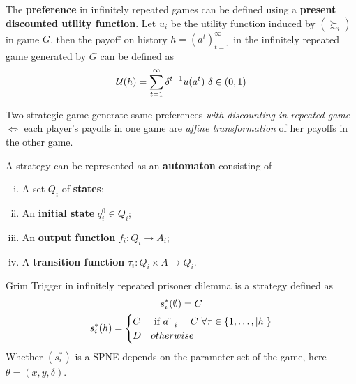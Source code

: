 \documentclass[11pt]{article}
\begin{document}
				\begin{definition}
					The \textbf{preference} in infinitely repeated games can be defined using a \textbf{present discounted utility function}. Let $u_i$ be the utility function induced by $(\succsim_i)$ in game $G$, then the payoff on history $h = (a^t)_{t=1}^\infty$ in the infinitely repeated game generated by $G$ can be defined as
					\begin{gather}
						\mathcal{{U}}(h) = \sum_{t=1}^\infty \delta^{t-1}u(a^t)\ \delta \in (0, 1)
					\end{gather}
				\end{definition}
				
				\begin{lemma}
					Two strategic game generate same preferences \emph{with discounting in repeated game} $\iff$ each player's payoffs in one game are \emph{affine transformation} of her payoffs in the other game.
				\end{lemma}
				
				\begin{definition}
					A strategy can be represented as an \textbf{automaton} consisting of
					\begin{enumerate}[(i)]
						\item A set $Q_i$ of \textbf{states};
						\item An \textbf{initial state} $q_i^0 \in Q_i$;
						\item An \textbf{output function} $f_i: Q_i \to A_i$;
						\item A \textbf{transition function} $\tau_i: Q_i \times A \to Q_i$.
					\end{enumerate}
				\end{definition}
				
				\begin{example} Grim Trigger in infinitely repeated prisoner dilemma is a strategy defined as
					\begin{gather}
						s^*_i(\emptyset) = C \\
						s^*_i(h) = \begin{cases}
							C &\text{{ if }} a_{-i}^{\tau} = C\ \forall \tau \in \{1, \dots, |h|\} \\
							D &{ otherwise}
						\end{cases}
					\end{gather}
					Whether $(s^*_i)$ is a SPNE depends on the parameter set of the game, here $\theta = (x, y, \delta)$. 
					\end{example}
					
\end{document}
